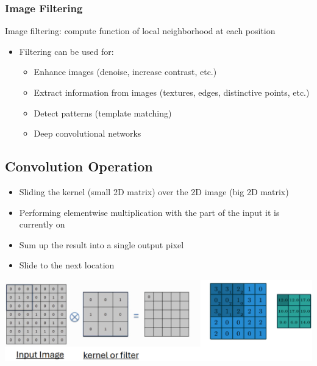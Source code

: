 \documentclass[10pt]{article}
\begin{document}
\subsubsection*{Image Filtering}
Image filtering: compute function of local neighborhood at each position
\begin{itemize}
	\item Filtering can be used for:
	\begin{itemize}
        \item Enhance images (denoise, increase contrast, etc.)
        \item Extract information from images (textures, edges, distinctive points, etc.)
        \item Detect patterns (template matching)
        \item Deep convolutional networks
    \end{itemize}
\end{itemize}

\subsection*{Convolution Operation}
\begin{itemize}
	\item Sliding the kernel (small 2D matrix) over the 2D image (big 2D matrix)
	\item Performing elementwise multiplication with the part of the input it is currently on
	\item Sum up the result into a single output pixel
	\item Slide to the next location
\end{itemize}
\begin{center} 
	\includegraphics*[width=\textwidth]{L2_7.png} 
\end{center}
\end{document}
